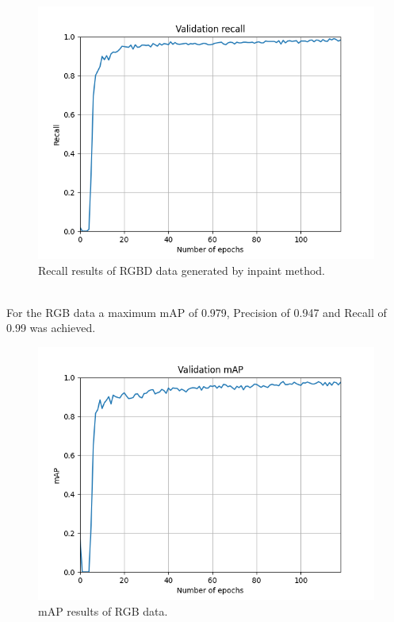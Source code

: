 \documentclass[twoside]{ctuthesis}
\theoremstyle{plain}
\theoremstyle{definition}
\theoremstyle{note}
\begin{document}
\begin{figure}[h!]
	\centering
	\includegraphics[width=\textwidth]{run-depth_inpaint-tag-validation_recall.png}
	\caption{Recall results of RGBD data generated by inpaint method.}
\end{figure}
\pagebreak
\\
For the RGB data a maximum mAP of 0.979, Precision of 0.947 and Recall of 0.99 was achieved.
\begin{figure}[h!]
	\centering
	\includegraphics[width=\textwidth]{run-no_depth120e-tag-validation_mAP.png}
	\caption{mAP results of RGB data.}
\end{figure}
\pagebreak
\end{document}
